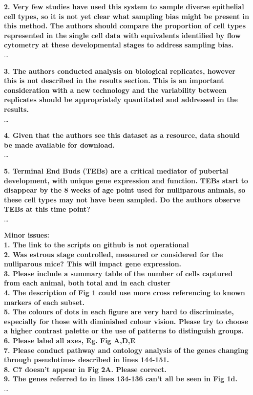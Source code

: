 \documentclass{article}
\begin{document}
\textbf{2. Very few studies have used this system to sample diverse epithelial cell types, so it is not yet clear what sampling bias might be present in this method. The authors should compare the proportion of cell types represented in the single cell data with equivalents identified by flow cytometry at these developmental stages to address sampling bias.}\\
\ldots

\textbf{3. The authors conducted analysis on biological replicates, however this is not described in the results section. This is an important consideration with a new technology and the variability between replicates should be appropriately quantitated and addressed in the results. }\\
\ldots

\textbf{4. Given that the authors see this dataset as a resource, data should be made available for download.}\\
\ldots

\textbf{5. Terminal End Buds (TEBs) are a critical mediator of pubertal development, with unique gene expression and function. TEBs start to disappear by the 8 weeks of age point used for nulliparous animals, so these cell types may not have been sampled. Do the authors observe TEBs at this time point?}\\
\ldots

\textbf{Minor issues: \\
1. The link to the scripts on github is not operational \\ 
2. Was estrous stage controlled, measured or considered for the nulliparous mice? This will impact gene expression. \\
3. Please include a summary table of the number of cells captured from each animal, both total and in each cluster \\
4. The description of Fig 1 could use more cross referencing to known markers of each subset. \\
5. The colours of dots in each figure are very hard to discriminate, especially for those with diminished colour vision. Please try to choose a higher contrast palette or the use of patterns to distinguish groups. \\
6. Please label all axes, Eg. Fig A,D,E \\
7. Please conduct pathway and ontology analysis of the genes changing through pseudotime- described in lines 144-151. \\
8. C7 doesn’t appear in Fig 2A. Please correct. \\
9. The genes referred to in lines 134-136 can’t all be seen in Fig 1d.}\\
\ldots
\end{document}
